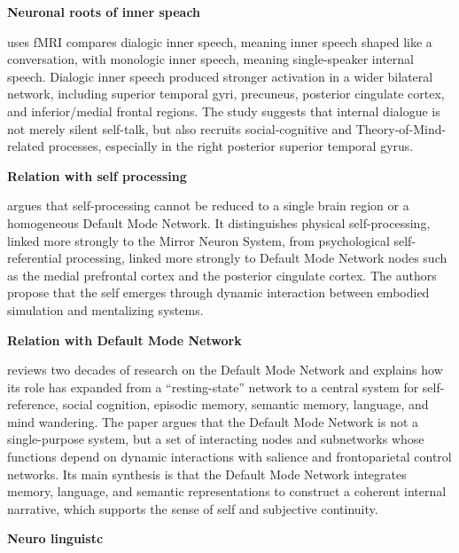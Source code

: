 \documentclass{book}
\providecommand{\ProjectDeepHeading}[2]{%
    \par\medskip\noindent\textbf{#2}\par\smallskip
}
\begin{document}
    
    \ProjectDeepHeading{6}{Neuronal roots of inner speach}
        \cite{alderson-day-2016-the-brains-conversation-with-itself-neural-substrates-of-dialogic-inner-speech} uses fMRI compares dialogic inner speech, meaning inner speech shaped like a conversation, with monologic inner speech, meaning single-speaker internal speech. Dialogic inner speech produced stronger activation in a wider bilateral network, including superior temporal gyri, precuneus, posterior cingulate cortex, and inferior/medial frontal regions. The study suggests that internal dialogue is not merely silent self-talk, but also recruits social-cognitive and Theory-of-Mind-related processes, especially in the right posterior superior temporal gyrus.
    
    
    \ProjectDeepHeading{7}{Relation with self processing}
        \cite{molnar-szakacs-2013-self-processing-and-the-default-mode-network-interactions-with-the-mirror-neuron-system} argues that self-processing cannot be reduced to a single brain region or a homogeneous Default Mode Network. It distinguishes physical self-processing, linked more strongly to the Mirror Neuron System, from psychological self-referential processing, linked more strongly to Default Mode Network nodes such as the medial prefrontal cortex and the posterior cingulate cortex. The authors propose that the self emerges through dynamic interaction between embodied simulation and mentalizing systems.
    
    
    \ProjectDeepHeading{6}{Relation with Default Mode Network}
        \cite{menon-2023-20-years-of-the-default-mode-network-a-review-and-synthesis} reviews two decades of research on the Default Mode Network and explains how its role has expanded from a “resting-state” network to a central system for self-reference, social cognition, episodic memory, semantic memory, language, and mind wandering. The paper argues that the Default Mode Network is not a single-purpose system, but a set of interacting nodes and subnetworks whose functions depend on dynamic interactions with salience and frontoparietal control networks. Its main synthesis is that the Default Mode Network integrates memory, language, and semantic representations to construct a coherent internal narrative, which supports the sense of self and subjective continuity.


\ProjectDeepHeading{6}{Neuro linguistc}
\end{document}
